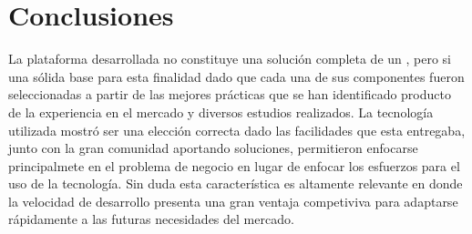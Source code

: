 

\chapter{Conclusiones} \label{cap:conclusiones}
	
	La plataforma desarrollada no constituye una solución completa de un \frameworkPC \ecommerceCOM, pero si una sólida base para esta finalidad dado que cada una de sus componentes fueron seleccionadas a partir de las mejores prácticas que se han identificado producto de la experiencia en el mercado y diversos estudios realizados.
	La tecnología utilizada mostró ser una elección correcta dado las facilidades que esta entregaba, junto con la gran comunidad aportando soluciones, permitieron enfocarse principalmete en el problema de negocio en lugar de enfocar los esfuerzos para el uso de la tecnología. Sin duda esta característica es altamente relevante en donde la velocidad de desarrollo presenta una gran ventaja competiviva para adaptarse rápidamente a las futuras necesidades del mercado.














